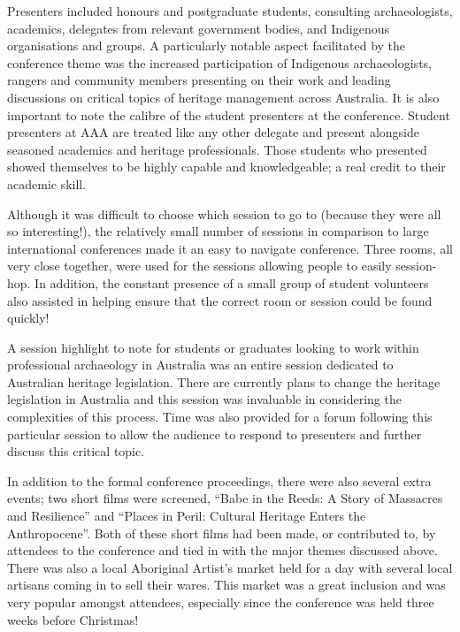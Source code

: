 Presenters included honours and postgraduate students, consulting archaeologists, academics, delegates from relevant government bodies, and Indigenous organisations and groups. A particularly notable aspect facilitated by the conference theme was the increased participation of Indigenous archaeologists, rangers and community members presenting on their work and leading discussions on critical topics of heritage management across Australia. It is also important to note the calibre of the student presenters at the conference. Student presenters at AAA are treated like any other delegate and present alongside seasoned academics and heritage professionals. Those students who presented showed themselves to be highly capable and knowledgeable; a real credit to their academic skill. 

Although it was difficult to choose which session to go to (because they were all so interesting!), the relatively small number of sessions in comparison to large international conferences made it an easy to navigate conference. Three rooms, all very close together, were used for the sessions allowing people to easily session-hop. In addition, the constant presence of a small group of student volunteers also assisted in helping ensure that the correct room or session could be found quickly!

A session highlight to note for students or graduates looking to work within professional archaeology in Australia was an entire session dedicated to Australian heritage legislation. There are currently plans to change the heritage legislation in Australia and this session was invaluable in considering the complexities of this process. Time was also provided for a forum following this particular session to allow the audience to respond to presenters and further discuss this critical topic.

In addition to the formal conference proceedings, there were also several extra events; two short films were screened, “Babe in the Reeds: A Story of Massacres and Resilience” and “Places in Peril: Cultural Heritage Enters the Anthropocene”. Both of these short films had been made, or contributed to, by attendees to the conference and tied in with the major themes discussed above. There was also a local Aboriginal Artist’s market held for a day with several local artisans coming in to sell their wares. This market was a great inclusion and was very popular amongst attendees, especially since the conference was held three weeks before Christmas! 

